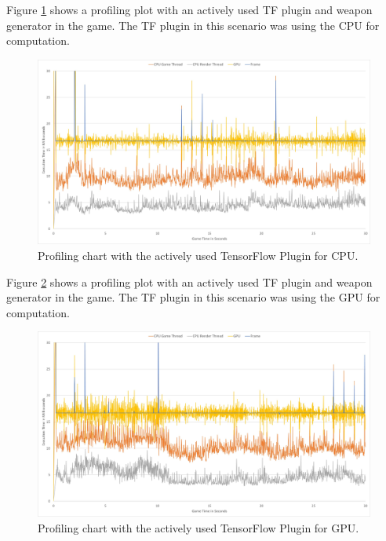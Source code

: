 \documentclass[MGS,Master,english]{twbook}%
\begin{document}
Figure \ref{scenario::profiling_CPU} shows a profiling plot with an actively used TF plugin and weapon generator in the game. The TF plugin in this scenario was using the CPU for computation. 
\begin{figure}[!ht]
	\centering
	\includegraphics[width=1.0\linewidth]{PICs/Profiling/tf_cpu}
	\caption{Profiling chart with the actively used TensorFlow Plugin for CPU.} \label{scenario::profiling_CPU}
\end{figure}

Figure \ref{scenario::profiling_GPU} shows a profiling plot with an actively used TF plugin and weapon generator in the game. The TF plugin in this scenario was using the GPU for computation.
\begin{figure}[!ht]
	\centering
	\includegraphics[width=1.0\linewidth]{PICs/Profiling/tf_gpu}
	\caption{Profiling chart with the actively used TensorFlow Plugin for GPU.} \label{scenario::profiling_GPU}
\end{figure}
\end{document}
